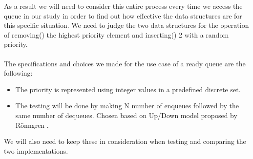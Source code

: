 \documentclass[12pt]{article}
\begin{document}
As a result we will need to consider this entire process every time we access the queue in our study in order to find out how effective the data structures are for this specific situation. We need to judge the two data structures for the operation of removing() the highest priority element and inserting() 2 with a random priority. 
\\
\\
The specifications and choices we made for the use case of a ready queue are the following: 

\begin{itemize}
   \item The priority is represented using integer values in a predefined discrete set. 
   \item The testing will be done by making N number of enqueues followed by the same number of dequeues. Chosen based on Up/Down model proposed by Rönngren  \cite{robert}. 
\end{itemize}

We will also need to keep these in consideration when testing and comparing the two implementations.
\end{document}
